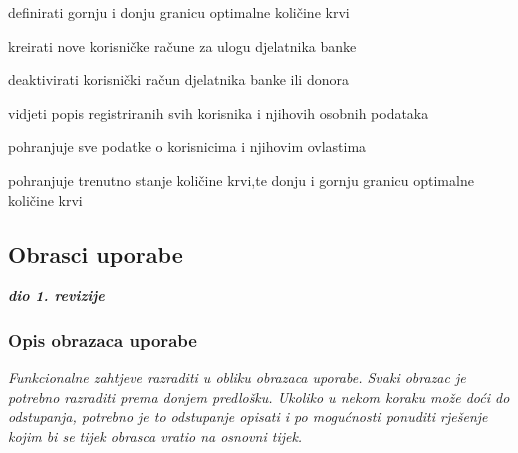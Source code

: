 \begin{packed_enum}
				\begin{packed_enum}
					
					\item definirati gornju i donju granicu optimalne količine krvi
					\item kreirati nove korisničke račune za ulogu djelatnika banke
					\item deaktivirati korisnički račun djelatnika banke ili donora
					\item vidjeti popis registriranih svih korisnika i njihovih osobnih podataka
					
				\end{packed_enum}

				\item  {}

				\begin{packed_enum}
					
					\item pohranjuje sve podatke o korisnicima i njihovim ovlastima
					\item pohranjuje trenutno stanje količine krvi,te donju i gornju granicu optimalne količine krvi
					
				\end{packed_enum}
			\end{packed_enum}
			
			\eject 
			
			
				
			\subsection{Obrasci uporabe}
				
				\textbf{\textit{dio 1. revizije}}
				
				\subsubsection{Opis obrazaca uporabe}
					\textit{Funkcionalne zahtjeve razraditi u obliku obrazaca uporabe. Svaki obrazac je potrebno razraditi prema donjem predlošku. Ukoliko u nekom koraku može doći do odstupanja, potrebno je to odstupanje opisati i po mogućnosti ponuditi rješenje kojim bi se tijek obrasca vratio na osnovni tijek.}\\
					

